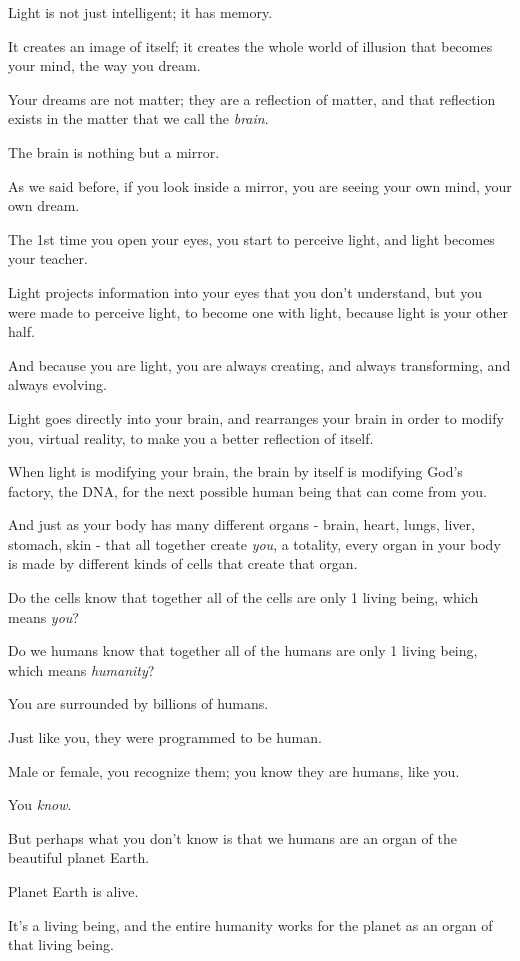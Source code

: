 \documentclass{article}
\numberwithin{equation}{section}
\begin{document}
Light is not just intelligent; it has memory.

It creates an image of itself; it creates the whole world of illusion that becomes your mind, the way you dream.

Your dreams are not matter; they are a reflection of matter, and that reflection exists in the matter that we call the \textit{brain}.

The brain is nothing but a mirror.

As we said before, if you look inside a mirror, you are seeing your own mind, your own dream.

%
The 1st time you open your eyes, you start to perceive light, and light becomes your teacher.

Light projects information into your eyes that you don't understand, but you were made to perceive light, to become one with light, because light is your other half.

And because you are light, you are always creating, and always transforming, and always evolving.

Light goes directly into your brain, and rearranges your brain in order to modify you, virtual reality, to make you a better reflection of itself.

When light is modifying your brain, the brain by itself is modifying God's factory, the DNA, for the next possible human being that can come from you.

%
And just as your body has many different organs - brain, heart, lungs, liver, stomach, skin - that all together create \textit{you}, a totality, every organ in your body is made by different kinds of cells that create that organ.

Do the cells know that together all of the cells are only 1 living being, which means \textit{you}?

Do we humans know that together all of the humans are only 1 living being, which means \textit{humanity}?

%
You are surrounded by billions of humans.

Just like you, they were programmed to be human.

Male or female, you recognize them; you know they are humans, like you.

You \textit{know}.

But perhaps what you don't know is that we humans are an organ of the beautiful planet Earth.

Planet Earth is alive.

It's a living being, and the entire humanity works for the planet as an organ of that living being.
\end{document}
